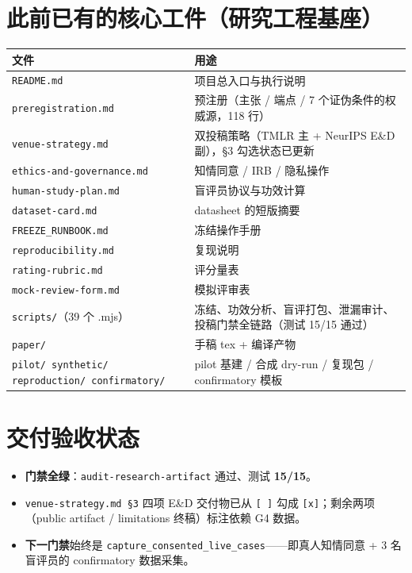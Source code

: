 \documentclass[11pt,a4paper]{ctexart}
\begin{document}
\section{此前已有的核心工件（研究工程基座）}

\begin{longtable}{@{}p{4.6cm}p{10.6cm}@{}}
\toprule
\textbf{文件} & \textbf{用途}\\
\midrule
\endhead
\texttt{README.md} & 项目总入口与执行说明\\
\texttt{preregistration.md} & 预注册（主张 / 端点 / 7 个证伪条件的权威源，118 行）\\
\texttt{venue-strategy.md} & 双投稿策略（TMLR 主 + NeurIPS E\&D 副），§3 勾选状态已更新\\
\texttt{ethics-and-governance.md} & 知情同意 / IRB / 隐私操作\\
\texttt{human-study-plan.md} & 盲评员协议与功效计算\\
\texttt{dataset-card.md} & datasheet 的短版摘要\\
\texttt{FREEZE\_RUNBOOK.md} & 冻结操作手册\\
\texttt{reproducibility.md} & 复现说明\\
\texttt{rating-rubric.md} & 评分量表\\
\texttt{mock-review-form.md} & 模拟评审表\\
\texttt{scripts/}（39 个 .mjs） & 冻结、功效分析、盲评打包、泄漏审计、投稿门禁全链路（测试 15/15 通过）\\
\texttt{paper/} & 手稿 tex + 编译产物\\
\texttt{pilot/ synthetic/ reproduction/ confirmatory/} & pilot 基建 / 合成 dry-run / 复现包 / confirmatory 模板\\
\bottomrule
\end{longtable}

\section{交付验收状态}
\begin{itemize}
\item \textbf{门禁全绿}：\texttt{audit-research-artifact} 通过、测试 \textbf{15/15}。
\item \texttt{venue-strategy.md §3} 四项 E\&D 交付物已从 \texttt{[ ]} 勾成 \texttt{[x]}；剩余两项（public artifact / limitations 终稿）标注依赖 G4 数据。
\item \textbf{下一门禁}始终是 \texttt{capture\_consented\_live\_cases}——即真人知情同意 + 3 名盲评员的 confirmatory 数据采集。
\end{itemize}
\end{document}

